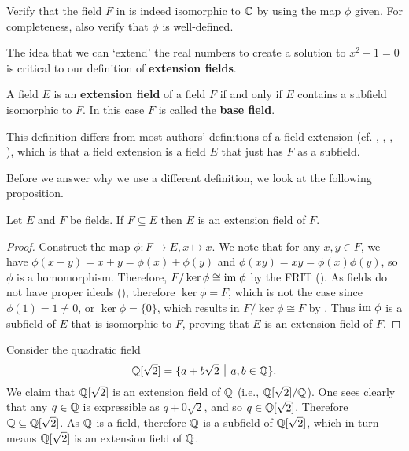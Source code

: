 \begin{exercise}\label{exercise-R[x]-mod-x^2+1-is-isomorphic-to-C}
    Verify that the field $F$ in  is indeed isomorphic to $\mathbb{C}$ by using the map $\phi$ given. For completeness, also verify that $\phi$ is well-defined.
\end{exercise}

The idea that we can `extend' the real numbers to create a solution to $x^2 + 1 = 0$ is critical to our definition of \textbf{extension fields}.

\begin{definition}
    A field $E$ is an \textbf{extension field} of a field $F$ if and only if $E$ contains a subfield isomorphic to $F$. In this case $F$ is called the \textbf{base field}.
\end{definition}
\begin{remark}
    This definition differs from most authors' definitions of a field extension (cf. \cite[p.~511]{dummit_foote_2004}, \cite[p.~442]{artin_2011}, \cite[p.~338]{gallian_2016}, \cite[p.~260]{judson_beezer_2022}), which is that a field extension is a field $E$ that just has $F$ as a subfield.
\end{remark}

Before we answer why we use a different definition, we look at the following proposition.

\begin{proposition}
    Let $E$ and $F$ be fields. If $F \subseteq E$ then $E$ is an extension field of $F$.
\end{proposition}
\begin{proof}
    Construct the map $\phi: F \to E, x \mapsto x$. We note that for any $x,y\in F$, we have $\phi(x + y) = x + y = \phi(x) + \phi(y)$ and $\phi(xy) = xy = \phi(x)\phi(y)$, so $\phi$ is a homomorphism. Therefore, $F/\ker\phi \cong \mathrm{im}\;\phi$ by the FRIT (). As fields do not have proper ideals (), therefore $\ker\phi = F$, which is not the case since $\phi(1) = 1 \neq 0$, or $\ker\phi = \{0\}$, which results in $F/\ker\phi \cong F$ by . Thus $\mathrm{im}\;\phi$ is a subfield of $E$ that is isomorphic to $F$, proving that $E$ is an extension field of $F$.
\end{proof}

\begin{example}
    Consider the quadratic field
    \[
        \Q[\sqrt{2}] = \{a + b\sqrt{2} \vert a,b\in\Q\}.
    \]
    We claim that $\mathbb{Q}[\sqrt{2}]$ is an extension field of $\mathbb{Q}$ (i.e., $\mathbb{Q}[\sqrt{2}]/\mathbb{Q}$). One sees clearly that any $q \in \mathbb{Q}$ is expressible as $q + 0\sqrt{2}$, and so $q \in \mathbb{Q}[\sqrt2]$. Therefore $\mathbb{Q} \subseteq \mathbb{Q}[\sqrt2]$. As $\mathbb{Q}$ is a field, therefore $\mathbb{Q}$ is a subfield of $\mathbb{Q}[\sqrt2]$, which in turn means $\mathbb{Q}[\sqrt2]$ is an extension field of $\mathbb{Q}$.
\end{example}

